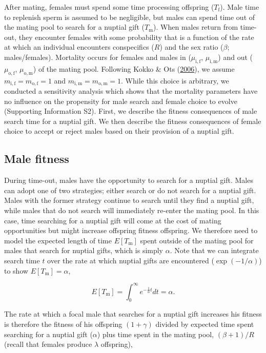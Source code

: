 \documentclass[
]{article}
\begin{document}
After mating, females must spend some time processing offspring
(\(T_{\mathrm{f}}\)). Male time to replenish sperm is assumed to be
negligible, but males can spend time out of the mating pool to search
for a nuptial gift (\(T_{\mathrm{m}}\)). When males return from
time-out, they encounter females with some probability that is a
function of the rate at which an individual encounters conspecifics
(\(R\)) and the sex ratio (\(\beta\); males/females). Mortality occurs
for females and males in (\(\mu_{\mathrm{i,f}}\),
\(\mu_{\mathrm{i,m}}\)) and out (\(\mu_{\mathrm{o,f}}\),
\(\mu_{\mathrm{o,m}}\)) of the mating pool. Following Kokko \& Ots
(\protect\hyperlink{ref-Kokko2006}{2006}), we assume
\(m_{\mathrm{i,f}} = m_{\mathrm{o,f}} = 1\) and
\(m_{\mathrm{i,m}} = m_{\mathrm{o,m}} = 1\). While this choice is
arbitrary, we conducted a sensitivity analysis which shows that the
mortality parameters have no influence on the propensity for male search
and female choice to evolve (Supporting Information S2). First, we
describe the fitness consequences of male search time for a nuptial
gift. We then describe the fitness consequences of female choice to
accept or reject males based on their provision of a nuptial gift.

\hypertarget{male-fitness}{%
\subsection{Male fitness}\label{male-fitness}}

During time-out, males have the opportunity to search for a nuptial
gift. Males can adopt one of two strategies; either search or do not
search for a nuptial gift. Males with the former strategy continue to
search until they find a nuptial gift, while males that do not search
will immediately re-enter the mating pool. In this case, time searching
for a nuptial gift will come at the cost of mating opportunities but
might increase offspring fitness offspring. We therefore need to model
the expected length of time \(E[T_{\mathrm{m}}]\) spent outside of the
mating pool for males that search for nuptial gifts, which is simply
\(\alpha\). Note that we can integrate search time \(t\) over the rate
at which nuptial gifts are encountered (\(\exp(-1/\alpha)\)) to show
\(E[T_{\mathrm{m}}] = \alpha\),

\[E[T_{\mathrm{m}}] = \int_{0}^{\infty}e^{- \frac{1}{\alpha}t}dt = \alpha.\]

The rate at which a focal male that searches for a nuptial gift
increases his fitness is therefore the fitness of his offspring
\((1 + \gamma)\) divided by expected time spent searching for a nuptial
gift (\(\alpha\)) plus time spent in the mating pool, \((\beta + 1)/R\)
(recall that females produce \(\lambda\) offspring),
\end{document}
